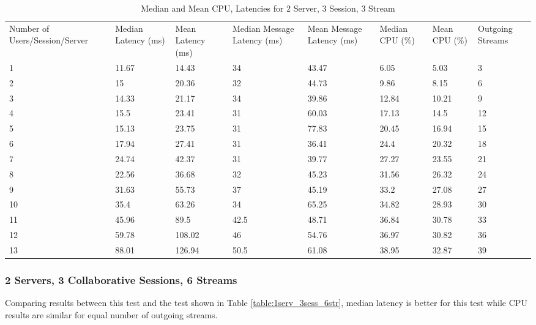 \begin{table}
\caption{Median and Mean CPU, Latencies for 2 Server, 3 Session, 3 Stream}
\label{table:2serv_3sess_3str}
\begin{tabu} to\linewidth{|X[c]|X[c]|X[c]|X[c]|X[c]|X[c]|X[c]|X[c]|}
\everyrow{\hline}
\hline
Number of Users/Session/Server & Median Latency (ms) & Mean Latency (ms) & Median Message Latency (ms) & Mean Message Latency (ms) & Median CPU (\%) & Mean CPU (\%) & Outgoing Streams\\
1 & 11.67 & 14.43 & 34 & 43.47 & 6.05 & 5.03 & 3 \\
2 & 15 & 20.36 & 32 & 44.73 & 9.86 & 8.15 & 6 \\
3 & 14.33 & 21.17 & 34 & 39.86 & 12.84 & 10.21 & 9 \\
4 & 15.5 & 23.41 & 31 & 60.03 & 17.13 & 14.5 & 12 \\
5 & 15.13 & 23.75 & 31 & 77.83 & 20.45 & 16.94 & 15 \\
6 & 17.94 & 27.41 & 31 & 36.41 & 24.4 & 20.32 & 18 \\
7 & 24.74 & 42.37 & 31 & 39.77 & 27.27 & 23.55 & 21 \\
8 & 22.56 & 36.68 & 32 & 45.23 & 31.56 & 26.32 & 24 \\
9 & 31.63 & 55.73 & 37 & 45.19 & 33.2 & 27.08 & 27 \\
10 & 35.4 & 63.26 & 34 & 65.25 & 34.82 & 28.93 & 30 \\
11 & 45.96 & 89.5 & 42.5 & 48.71 & 36.84 & 30.78 & 33 \\
12 & 59.78 & 108.02 & 46 & 54.76 & 36.97 & 30.82 & 36 \\
13 & 88.01 & 126.94 & 50.5 & 61.08 & 38.95 & 32.87 & 39 \\
\end{tabu}
\end{table}

\clearpage\subsubsection{2 Servers, 3 Collaborative Sessions, 6 Streams}

Comparing results between this test and the test shown in Table \ref{table:1serv_3sess_6str}, median latency is better for this test while CPU results are similar for equal number of outgoing streams.
 
